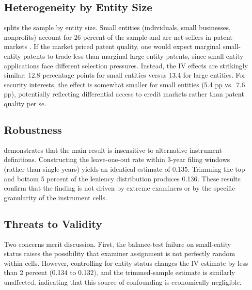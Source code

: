 \documentclass[12pt]{article}
\begin{document}


\subsection{Heterogeneity by Entity Size}

 splits the sample by entity size. Small entities (individuals, small businesses, nonprofits) account for 26 percent of the sample and are net sellers in patent markets \citep{figueroa2019patent}. If the market priced patent quality, one would expect marginal small-entity patents to trade less than marginal large-entity patents, since small-entity applications face different selection pressures. Instead, the IV effects are strikingly similar: 12.8 percentage points for small entities versus 13.4 for large entities. For security interests, the effect is somewhat smaller for small entities (5.4 pp vs.~7.6 pp), potentially reflecting differential access to credit markets rather than patent quality per se.



\subsection{Robustness}

 demonstrates that the main result is insensitive to alternative instrument definitions. Constructing the leave-one-out rate within 3-year filing windows (rather than single years) yields an identical estimate of 0.135. Trimming the top and bottom 5 percent of the leniency distribution produces 0.136. These results confirm that the finding is not driven by extreme examiners or by the specific granularity of the instrument cells.



\subsection{Threats to Validity}

Two concerns merit discussion. First, the balance-test failure on small-entity status raises the possibility that examiner assignment is not perfectly random within cells. However, controlling for entity status changes the IV estimate by less than 2 percent (0.134 to 0.132), and the trimmed-sample estimate is similarly unaffected, indicating that this source of confounding is economically negligible.
\end{document}
